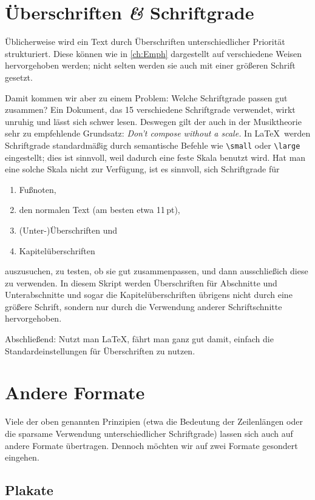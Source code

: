 \section{Überschriften \emph{\&} Schriftgrade}

Üblicherweise wird ein Text durch Überschriften unterschiedlicher Priorität
strukturiert. Diese können wie in \cref{ch:Emph} dargestellt auf verschiedene
Weisen hervorgehoben werden; nicht selten werden sie auch mit einer größeren
Schrift gesetzt.

Damit kommen wir aber zu einem Problem: Welche Schriftgrade passen gut
zusammen? Ein Dokument, das 15 verschiedene Schriftgrade verwendet, wirkt
unruhig und lässt sich schwer lesen. Deswegen gilt der auch in der Musiktheorie
sehr zu empfehlende Grundsatz: \emph{Don’t compose without a scale.} In \LaTeX\
werden Schriftgrade standardmäßig durch semantische Befehle wie \verb!\small!
oder \verb!\large! eingestellt; dies ist sinnvoll, weil dadurch eine feste Skala
benutzt wird. Hat man eine solche Skala nicht zur Verfügung, ist es sinnvoll,
sich Schriftgrade für
\begin{enumerate}
\item Fußnoten,
\item den normalen Text (am besten etwa 11\,pt),
\item (Unter-)Überschriften und
\item Kapitelüberschriften
\end{enumerate}
auszusuchen, zu testen, ob sie gut zusammenpassen, und dann ausschließich diese
zu verwenden. In diesem Skript werden Überschriften für Abschnitte und
Unterabschnitte und sogar die Kapitelüberschriften übrigens nicht durch eine
größere Schrift, sondern nur durch die Verwendung anderer Schriftschnitte
hervorgehoben.

Abschließend: Nutzt man \LaTeX, fährt man ganz gut damit, einfach die
Standardeinstellungen für Überschriften zu nutzen.

\section{Andere Formate}

Viele der oben genannten Prinzipien (etwa die Bedeutung der Zeilenlängen
oder die sparsame Verwendung unterschiedlicher Schriftgrade) lassen sich auch
auf andere Formate übertragen. Dennoch möchten wir auf zwei Formate gesondert
eingehen.

\subsection{Plakate}

